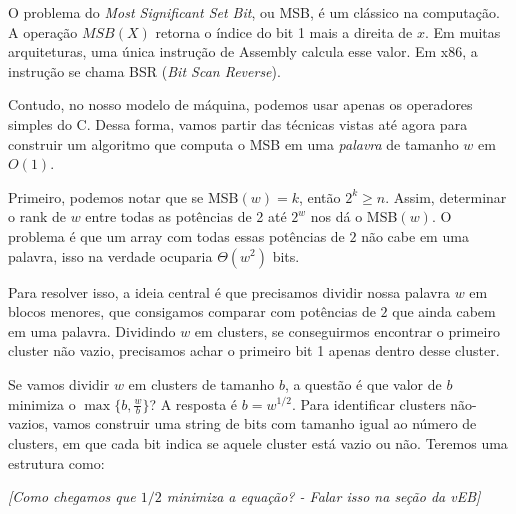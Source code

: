 O problema do \textit{Most Significant Set Bit}, ou MSB, é um clássico na
computação. A operação $MSB(X)$ retorna o índice do bit 1 mais a direita de $x$.
Em muitas arquiteturas, uma única instrução de Assembly calcula esse valor. Em
x86, a instrução se chama BSR (\textit{Bit Scan Reverse}).

Contudo, no nosso modelo de máquina, podemos usar apenas os operadores simples
do C. Dessa forma, vamos partir das técnicas vistas até agora para construir um
algoritmo que computa o MSB em uma \textit{palavra} de tamanho $w$ em $O(1)$.

Primeiro, podemos notar que se MSB$(w) = k$, então $2^k\geq n$. Assim,
determinar o rank de $w$ entre todas as potências de 2 até $2^w$ nos dá o
MSB$(w)$. O problema é que um array com todas essas potências de $2$ não cabe em
uma palavra, isso na verdade ocuparia $\Theta(w^2)$ bits.

Para resolver isso, a ideia central é que precisamos dividir nossa palavra $w$
em blocos menores, que consigamos comparar com potências de $2$ que ainda cabem
em uma palavra. Dividindo $w$ em clusters, se conseguirmos encontrar o primeiro
cluster não vazio, precisamos achar o primeiro bit 1 apenas dentro desse
cluster.

Se vamos dividir $w$ em clusters de tamanho $b$, a questão é que valor de $b$
minimiza o $\max \{b,\frac{w}{b}\}$? A resposta é $b=w^{1/2}$. Para identificar
clusters não-vazios, vamos construir uma string de bits com tamanho igual ao
número de clusters, em que cada bit indica se aquele cluster está vazio ou não.
Teremos uma estrutura como:

\textit{[Como chegamos que $1/2$ minimiza a equação? - Falar isso na seção da vEB]}

